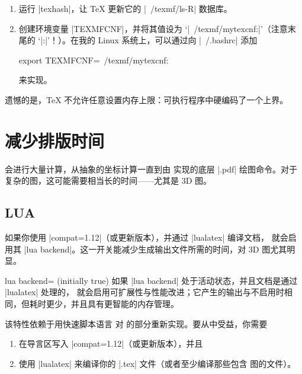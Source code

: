 {\begin{enumerate}
\begin{codeexample}[code only]
\end{codeexample}
    \item 运行 |texhash|，让 \TeX{} 更新它的 |~/texmf/ls-R| 数据库。
    \item 创建环境变量 |TEXMFCNF|，并将其值设为 `|~/texmf/mytexcnf:|'（注意末尾的 `|:|'！）。在我的 Linux 系统上，可以通过向 |~/.bashrc| 添加
\begin{codeexample}
export TEXMFCNF=~/texmf/mytexcnf:
\end{codeexample}
        来实现。
\end{enumerate}

遗憾的是，\TeX{} 不允许任意设置内存上限：可执行程序中硬编码了一个上界。


\section{减少排版时间}

\PGFPlots{} 会进行大量计算，从抽象的坐标计算一直到由 \PGF{} 实现的底层 |.pdf| 绘图命令。对于复杂的图，这可能需要相当长的时间——尤其是 3D 图。


\subsection{LUA}

如果你使用 |compat=1.12|（或更新版本），并通过 |lualatex| 编译文档，\PGFPlots{} 就会启用其 |lua backend|。这一开关能减少生成输出文件所需的时间，对 3D 图尤其明显。

\begin{pgfplotskey}{lua backend= (initially true)}
    如果 |lua backend| 处于活动状态，并且文档是通过 |lualatex| 处理的，\PGFPlots{} 就会启用可扩展性与性能改进；它产生的输出与不启用时相同，但耗时更少，并且具有更智能的内存管理。

    该特性依赖于用快速脚本语言 \lua 对 \PGFPlots{} 的部分重新实现。要从中受益，你需要
    \begin{enumerate}
        \item 在导言区写入 |compat=1.12|（或更新版本），并且
        \item 使用 |lualatex| 来编译你的 |.tex| 文件（或者至少编译那些包含 \PGFPlots{} 图的文件）。
    \end{enumerate}


\end{pgfplotskey}}
